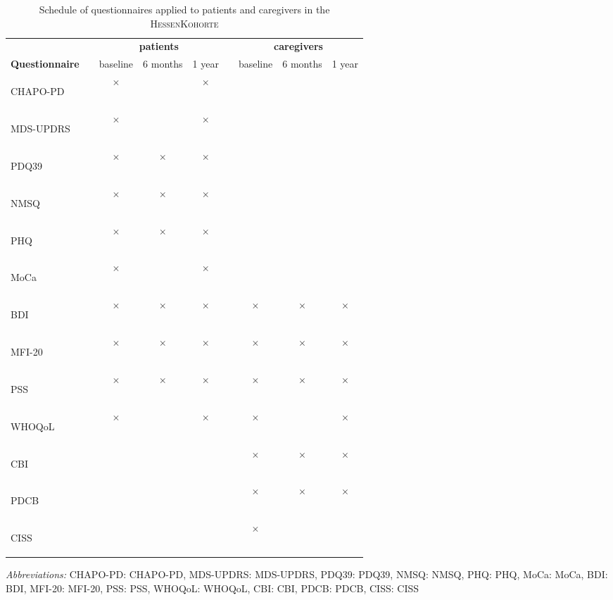 \newcommand{\FC}{$\times$}
\newcommand{\emC}{}
\newcommand{\acb}[1]{\acs{#1}: \acl{#1}}
\newcommand{\acv}[1]{\begin{NoHyper}\acs{#1}\end{NoHyper}}
\begin{table}[H]
\begin{tabular}{lcccccccc}
\caption{Schedule of questionnaires applied to patients and caregivers in the \textsc{HessenKohorte}}
\label{tab:questionnaireSchedule}\\
\textbf{} & & \multicolumn{3}{c}{\textbf{patients}} & & \multicolumn{3}{c}{\textbf{caregivers}} \\[1em]
\textbf{Questionnaire}& & baseline & 6 months & 1 year  & & baseline   & 6 months & 1 year \\[1em]
\acv{CHAPO-PD}        & & \FC{}    & \emC{}   & \FC{}   & & \emC{} & \emC{}   & \emC{} \\
\acv{MDS-UPDRS}       & & \FC{}    & \emC{}   & \FC{}   & & \emC{} & \emC{}   & \emC{} \\
\acv{PDQ39}           & & \FC{}    & \FC{}    & \FC{}   & & \emC{} & \emC{}   & \emC{} \\
\acv{NMSQ}            & & \FC{}    & \FC{}    & \FC{}   & & \emC{} & \emC{}   & \emC{} \\
\acv{PHQ}             & & \FC{}    & \FC{}    & \FC{}   & & \emC{} & \emC{}   & \emC{} \\
\acv{MoCa}            & & \FC{}    & \emC{}   & \FC{}   & & \emC{} & \emC{}   & \emC{} \\
\acv{BDI}             & & \FC{}    & \FC{}    & \FC{}   & & \FC{}  & \FC{}    & \FC{}  \\
\acv{MFI-20}          & & \FC{}    & \FC{}    & \FC{}   & & \FC{}  & \FC{}    & \FC{}  \\
\acv{PSS}             & & \FC{}    & \FC{}    & \FC{}   & & \FC{}  & \FC{}    & \FC{}  \\ 
\acv{WHOQoL}          & & \FC{}    & \emC{}   & \FC{}   & & \FC{}  & \emC{}   & \FC{}  \\
\acv{CBI}             & & \emC{}   & \emC{}   & \emC{}  & & \FC{}  & \FC{}    & \FC{}  \\
\acv{PDCB}            & & \emC{}   & \emC{}   & \emC{}  & & \FC{}  & \FC{}    & \FC{}  \\                              
\acv{CISS}            & & \emC{}   & \emC{}   & \emC{}  & & \FC{}  & \emC{}   & \emC{}
\end{tabular}

\bigskip
\footnotesize{\textit{Abbreviations:} \acb{CHAPO-PD}, \acb{MDS-UPDRS}, \acb{PDQ39}, \acb{NMSQ}, \acb{PHQ},
\acb{MoCa}, \acb{BDI}, \acb{MFI-20}, \acb{PSS}, \acb{WHOQoL}, \acb{CBI}, \acb{PDCB}, \acb{CISS}}
\end{table}
